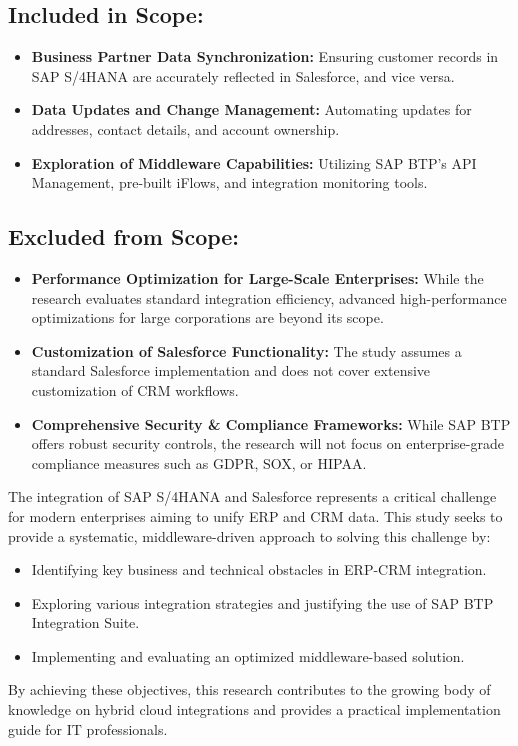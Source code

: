 \subsection{Included in Scope:}
\begin{itemize}
    \item \textbf{Business Partner Data Synchronization:} Ensuring customer records in SAP S/4HANA are accurately reflected in Salesforce, and vice versa.
    \item \textbf{Data Updates and Change Management:} Automating updates for addresses, contact details, and account ownership.
    \item \textbf{Exploration of Middleware Capabilities:} Utilizing SAP BTP’s API Management, pre-built iFlows, and integration monitoring tools.
\end{itemize}

\subsection{Excluded from Scope:}
\begin{itemize}
    \item \textbf{Performance Optimization for Large-Scale Enterprises:} While the research evaluates standard integration efficiency, advanced high-performance optimizations for large corporations are beyond its scope.
    \item \textbf{Customization of Salesforce Functionality:} The study assumes a standard Salesforce implementation and does not cover extensive customization of CRM workflows.
    \item \textbf{Comprehensive Security \& Compliance Frameworks:} While SAP BTP offers robust security controls, the research will not focus on enterprise-grade compliance measures such as GDPR, SOX, or HIPAA.
\end{itemize}

The integration of SAP S/4HANA and Salesforce represents a critical challenge for modern enterprises aiming to unify ERP and CRM data. This study seeks to provide a systematic, middleware-driven approach to solving this challenge by:
\begin{itemize}
    \item Identifying key business and technical obstacles in ERP-CRM integration.
    \item Exploring various integration strategies and justifying the use of SAP BTP Integration Suite.
    \item Implementing and evaluating an optimized middleware-based solution.
\end{itemize}

By achieving these objectives, this research contributes to the growing body of knowledge on hybrid cloud integrations and provides a practical implementation guide for IT professionals.

\newpage
